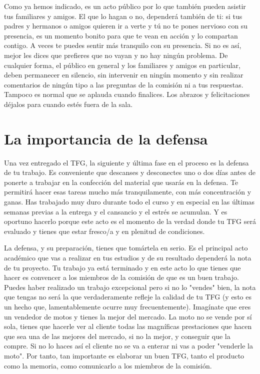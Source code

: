 Como ya hemos indicado, es un acto público por lo que también pueden asistir tus familiares y amigos. El que lo hagan o no, dependerá también de ti: si tus padres y hermanos o amigos quieren ir a verte y tú no te pones nervioso con su presencia, es un momento bonito para que te vean en acción y lo compartan contigo. A veces te puedes sentir más tranquilo con su presencia. Si no es así, mejor les dices que prefieres que no vayan y no hay ningún problema. De cualquier forma, el público en general y los familiares y amigos en particular, deben permanecer en silencio, sin intervenir en ningún momento y sin realizar comentarios de ningún tipo a las preguntas de la comisión ni a tus respuestas. Tampoco es normal que se aplauda cuando finalices. Los abrazos y felicitaciones déjalos para cuando estés fuera de la sala.

\section{La importancia de la defensa}


Una vez entregado el TFG, la siguiente y última fase en el proceso es la defensa de tu trabajo. Es conveniente que descanses y desconectes uno o dos días antes de ponerte a trabajar en la confección del material que usarás en la defensa. Te permitirá hacer esas tareas mucho más tranquilamente, con más concentración y ganas. Has trabajado muy duro durante todo el curso y en especial en las últimas semanas previas a la entrega y el cansancio y el estrés se acumulan. Y es oportuno hacerlo porque este acto es el momento de la verdad donde tu TFG será evaluado y tienes que estar fresco/a y en plenitud de condiciones.

La defensa, y su preparación, tienes que tomártela en serio. Es el principal acto académico que vas a realizar en tus estudios y de su resultado dependerá la nota de tu proyecto. Tu trabajo ya está terminado y en este acto lo que tienes que hacer es convencer a los miembros de la comisión de que es un buen trabajo. Puedes haber realizado un trabajo excepcional pero si no lo "vendes" bien, la nota que tengas no será la que verdaderamente refleje la calidad de tu TFG (y esto es un hecho que, lamentablemente ocurre muy frecuentemente). Imagínate que eres un vendedor de motos y tienes la mejor del mercado. La moto no se vende por sí sola, tienes que hacerle ver al cliente todas las magníficas prestaciones que hacen que sea una de las mejores del mercado, si no la mejor, y conseguir que la compre. Si no lo haces así el cliente no se va a enterar ni vas a poder "venderle la moto". Por tanto, tan importante es elaborar un buen TFG, tanto el producto como la memoria, como comunicarlo a los miembros de la comisión. 

